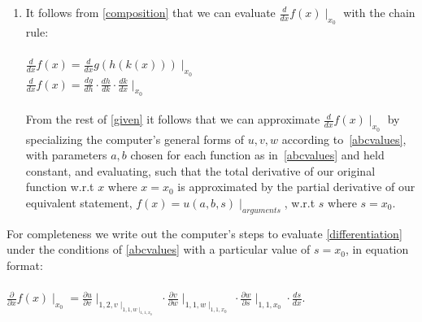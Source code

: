 \documentclass[preprint,12pt]{elsarticle}
\begin{document}
\begin{enumerate}
\item 
\label{differentiation}
It follows from \ref{composition} that we can evaluate $\frac{d}{d x}f(x) \mid_{x_0}$ with the chain rule: \\ \\
$\frac{d}{d x}f(x) = \frac{d}{d x} g(h(k(x))) \mid_{x_0}$ \\
$\frac{d}{d x}f(x) =  \frac{d{g}}{d{h}} \cdot \frac{d{h}}{d{k}}
\cdot \frac{d{k}}{d{x}}\mid_{x_0}$ \\ \\
From the rest of \ref{given} it follows that we can approximate  $\frac{d}{d x}f(x) \mid_{x_0}$ by
specializing the computer's general forms of $u, v, w$ 
according to~\ref{abcvalues}, with parameters $a, b$ chosen for each function as in~\ref{abcvalues} and held constant, and
evaluating, such that the total derivative of our original function w.r.t $x$ where $x = x_0$ is approximated
by the partial derivative of our equivalent statement, $f(x) = u(a, b, s) \mid_{arguments}$,  w.r.t $s$ 
where $s = x_0$. \\

\end{enumerate}
\label{doingthework}
For completeness we write out the computer's steps to evaluate \ref{differentiation} under the conditions of
\ref{abcvalues} with a particular value of $s = x_0$, in equation format: \\ \\
$\frac{\partial}{\partial x}f(x) \mid _{x_0} = \frac{\partial{u}}{\partial{v}} \mid _{1, 2, v \mid _{1, 1, w \mid _{ 1, 1, x_0}}} \cdot \frac{\partial{v}}{\partial{w}} \mid _{1,1, w \mid _{1, 1, x_0}} \cdot \frac{\partial{w}}{\partial{s}} \mid _{1, 1, x_0} \cdot \frac{ds}{dx}.$\\ \\
\end{document}
